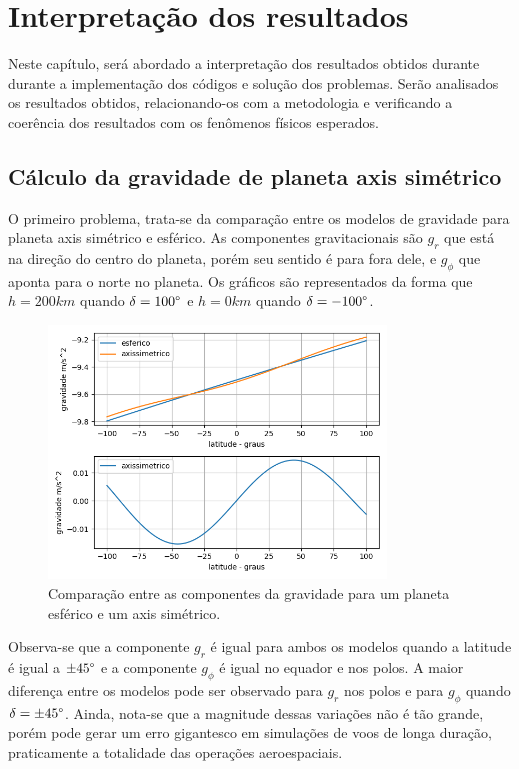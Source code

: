 \chapter{Interpretação dos resultados}

Neste capítulo, será abordado a interpretação dos resultados obtidos durante durante a implementação dos códigos e solução dos problemas. Serão analisados os resultados obtidos, relacionando-os com a metodologia e verificando a coerência dos resultados com os fenômenos físicos esperados. 

\section{Cálculo da gravidade de planeta axis simétrico}


O primeiro problema, trata-se da comparação entre os modelos de gravidade para planeta axis simétrico e esférico. As componentes gravitacionais são $g_r$ que está na direção do centro do planeta, porém seu sentido é para fora dele, e $g_{\phi}$ que aponta para o norte no planeta. Os gráficos são representados da forma que $h = 200 km$ quando $\delta = 100 \degree$ e $h = 0 km$ quando $\delta = -100\degree$.

\begin{figure}[H]
\centering
\caption{Comparação entre as componentes da gravidade para um planeta esférico e um axis simétrico.}
\label{fig: Exemplo 3.1}
\includegraphics[width=0.8\textwidth]{figuras/Resultados/exemplo31.png}
\end{figure}

Observa-se que a componente $g_r$ é igual para ambos os modelos quando a latitude é igual a $\pm 45\degree$ e a componente $g_{\phi}$ é igual no equador e nos polos. A maior diferença entre os modelos pode ser observado para $g_r$ nos polos e para $g_{\phi}$ quando $\delta = \pm 45 \degree$. Ainda, nota-se que a magnitude dessas variações não é tão grande, porém pode gerar um erro gigantesco em simulações de voos de longa duração, praticamente a totalidade das operações aeroespaciais.

